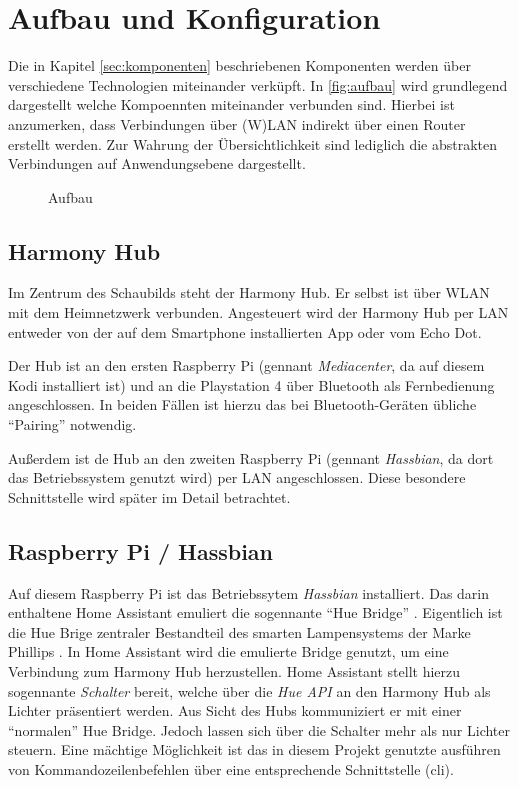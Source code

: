 \section{Aufbau und Konfiguration}\label{sec:aufbau}
Die in Kapitel \ref{sec:komponenten} \textit{} beschriebenen Komponenten werden über verschiedene Technologien miteinander verküpft.
In \autoref{fig:aufbau} wird grundlegend dargestellt welche Kompoennten miteinander verbunden sind.
Hierbei ist anzumerken, dass Verbindungen über (W)LAN indirekt über einen Router erstellt werden.
Zur Wahrung der Übersichtlichkeit sind lediglich die abstrakten Verbindungen auf Anwendungsebene dargestellt.

\begin{figure}[ht!]
    \centering
    \resizebox{\textwidth}{!}{
        
    }
    \caption{Aufbau}
    \label{fig:aufbau}
\end{figure}

\subsection{Harmony Hub}\label{sec:aufbau-hub}
Im Zentrum des Schaubilds steht der Harmony Hub.
Er selbst ist über WLAN mit dem Heimnetzwerk verbunden.
Angesteuert wird der Harmony Hub per LAN entweder von der auf dem Smartphone installierten App oder vom Echo Dot.

Der Hub ist an den ersten Raspberry Pi (gennant \textit{Mediacenter}, da auf diesem Kodi installiert ist)
und an die Playstation 4 über Bluetooth als Fernbedienung angeschlossen.
In beiden Fällen ist hierzu das bei Bluetooth-Geräten übliche \enquote{Pairing} notwendig.

Außerdem ist de Hub an den zweiten Raspberry Pi (gennant \textit{Hassbian}, da dort das Betriebssystem genutzt wird) per LAN angeschlossen.
Diese besondere Schnittstelle wird später im Detail betrachtet.

\subsection{Raspberry Pi / Hassbian}\label{sec:aufbau-hassbian}
Auf diesem Raspberry Pi ist das Betriebssytem \textit{Hassbian} installiert.
Das darin enthaltene Home Assistant emuliert die sogennante \enquote{Hue Bridge} \cite{Emulated83:online}.
Eigentlich ist die Hue Brige zentraler Bestandteil des smarten Lampensystems der Marke Phillips \cite{HueBridg65:online}.
In Home Assistant wird die emulierte Bridge genutzt, um eine Verbindung zum Harmony Hub herzustellen.
Home Assistant stellt hierzu sogennante \textit{Schalter} bereit, welche über die \textit{Hue API} an den Harmony Hub als Lichter präsentiert werden.
Aus Sicht des Hubs kommuniziert er mit einer \enquote{normalen} Hue Bridge.
Jedoch lassen sich über die Schalter mehr als nur Lichter steuern.
Eine mächtige Möglichkeit ist das in diesem Projekt genutzte ausführen von Kommandozeilenbefehlen über eine entsprechende Schnittstelle (\ac{cli}).

